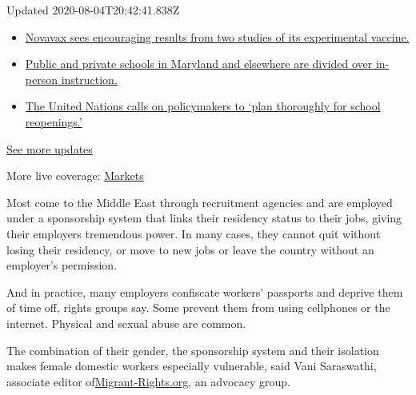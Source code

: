 Updated 2020-08-04T20:42:41.838Z

\begin{itemize}
\tightlist
\item
  \href{https://www.nytimes.com/2020/08/04/world/coronavirus-cases.html?action=click\&pgtype=Article\&state=default\&region=MAIN_CONTENT_1\&context=storylines_live_updates\#link-1228a480}{Novavax
  sees encouraging results from two studies of its experimental
  vaccine.}
\item
  \href{https://www.nytimes.com/2020/08/04/world/coronavirus-cases.html?action=click\&pgtype=Article\&state=default\&region=MAIN_CONTENT_1\&context=storylines_live_updates\#link-4825b93}{Public
  and private schools in Maryland and elsewhere are divided over
  in-person instruction.}
\item
  \href{https://www.nytimes.com/2020/08/04/world/coronavirus-cases.html?action=click\&pgtype=Article\&state=default\&region=MAIN_CONTENT_1\&context=storylines_live_updates\#link-50f7386d}{The
  United Nations calls on policymakers to `plan thoroughly for school
  reopenings.'}
\end{itemize}

\href{https://www.nytimes.com/2020/08/04/world/coronavirus-cases.html?action=click\&pgtype=Article\&state=default\&region=MAIN_CONTENT_1\&context=storylines_live_updates}{See
more updates}

More live coverage:
\href{https://www.nytimes.com/live/2020/08/04/business/stock-market-today-coronavirus?action=click\&pgtype=Article\&state=default\&region=MAIN_CONTENT_1\&context=storylines_live_updates}{Markets}

Most come to the Middle East through recruitment agencies and are
employed under a sponsorship system that links their residency status to
their jobs, giving their employers tremendous power. In many cases, they
cannot quit without losing their residency, or move to new jobs or leave
the country without an employer's permission.

And in practice, many employers confiscate workers' passports and
deprive them of time off, rights groups say. Some prevent them from
using cellphones or the internet. Physical and sexual abuse are common.

The combination of their gender, the sponsorship system and their
isolation makes female domestic workers especially vulnerable, said Vani
Saraswathi, associate editor
of\href{https://www.migrant-rights.org/}{Migrant-Rights.org}, an
advocacy group.

